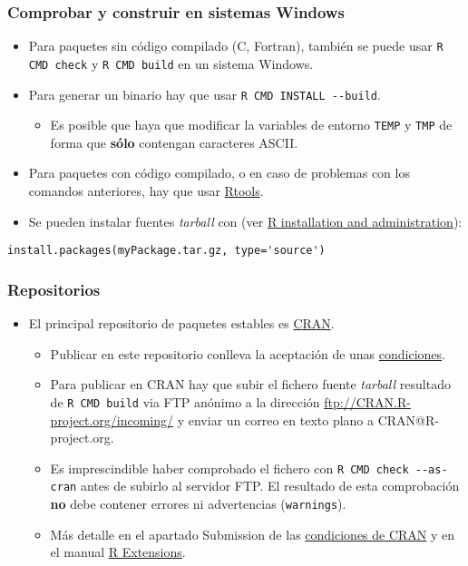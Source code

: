\documentclass[xcolor={usenames,svgnames,dvipsnames}]{beamer}
\begin{document}
\begin{frame}[fragile]
\frametitle{Comprobar y construir en sistemas Windows}
\label{sec-3-4}


\begin{itemize}
\item Para paquetes sin código compilado (C, Fortran), también se puede usar
  \texttt{R CMD check} y \texttt{R CMD build} en un sistema Windows.
\item Para generar un binario hay que usar \texttt{R CMD INSTALL -{}-build}.
\begin{itemize}
\item Es posible que haya que modificar la variables de entorno
    \texttt{TEMP} y \texttt{TMP} de forma que \textbf{sólo} contengan caracteres ASCII.
\end{itemize}
\item Para paquetes con código compilado, o en caso de problemas con
  los comandos anteriores, hay que usar \href{http://cran.r-project.org/bin/windows/Rtools/}{Rtools}.
\item Se pueden instalar fuentes \emph{tarball} con (ver \href{http://cran.r-project.org/doc/manuals/R-admin.html#Windows-packages}{R installation and administration}):
\end{itemize}

\begin{verbatim}
install.packages(myPackage.tar.gz, type='source')
\end{verbatim}
\end{frame}
\begin{frame}
\frametitle{Repositorios}
\label{sec-3-5}

\begin{itemize}
\item El principal repositorio de paquetes estables es \href{http://cran.r-project.org/}{CRAN}.
\begin{itemize}
\item Publicar en este repositorio conlleva la aceptación de unas \href{http://cran.r-project.org/web/packages/policies.html}{condiciones}.
\item Para publicar en CRAN hay que subir el fichero fuente
    \emph{tarball} resultado de \texttt{R CMD build} via FTP anónimo a la
    dirección \href{ftp://CRAN.R-project.org/incoming/}{ftp://CRAN.R-project.org/incoming/} y enviar un
    correo en texto plano a CRAN@R-project.org.
\item Es imprescindible haber comprobado el fichero con \texttt{R CMD check     -{}-as-cran} antes de subirlo al servidor FTP. El resultado de
    esta comprobación \textbf{no} debe contener errores ni advertencias
    (\texttt{warnings}).
\item Más detalle en el apartado Submission de las \href{http://cran.r-project.org/web/packages/policies.html}{condiciones de CRAN} y en el manual \href{http://cran.r-project.org/doc/manuals/R-exts.html#Submitting-a-package-to-CRAN}{R Extensions}.
\end{itemize}
\end{itemize}
\end{frame}
\end{document}
